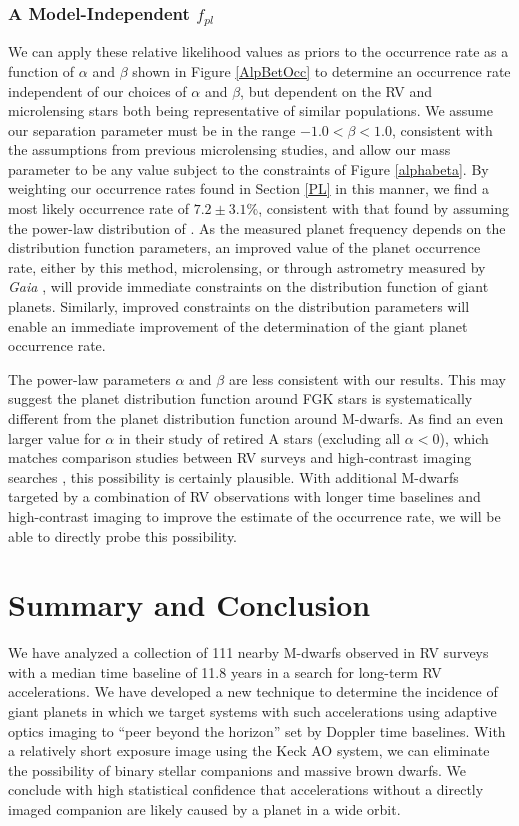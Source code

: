 \subsubsection{A Model-Independent $f_{pl}$}
We can apply these relative likelihood values as priors to the occurrence rate as a function of $\alpha$ and $\beta$ shown in Figure \ref{AlpBetOcc} to determine an occurrence rate independent of our choices of $\alpha$ and $\beta$, but dependent on the RV and microlensing stars both being representative of similar populations. We assume our separation parameter must be in the range $-1.0 < \beta < 1.0$, consistent with the assumptions from previous microlensing studies, and allow our mass parameter to be any value subject to the constraints of Figure \ref{alphabeta}. By weighting our occurrence rates found in Section \ref{PL} in this manner, we find a most likely occurrence rate of $7.2 \pm 3.1\%$, consistent with that found by assuming the power-law distribution of \citet{Cumming08}. As the measured planet frequency depends on the distribution function parameters, an improved value of the planet occurrence rate, either by this method, microlensing, or through astrometry measured by \textit{Gaia} \citep{Casertano08}, will provide immediate constraints on the distribution function of giant planets. Similarly, improved constraints on the distribution parameters will enable an immediate improvement of the determination of the giant planet occurrence rate.

The \citet{Cumming08} power-law parameters $\alpha$ and $\beta$ are less consistent with our results. This may suggest the planet distribution function around FGK stars is systematically different from the planet distribution function around M-dwarfs. As \citet{Bowler10} find an even larger value for $\alpha$ in their study of retired A stars (excluding all $\alpha < 0$), which matches comparison studies between RV surveys and high-contrast imaging searches \citep{Crepp11}, this possibility is certainly plausible. With additional M-dwarfs targeted by a combination of RV observations with longer time baselines and high-contrast imaging to improve the estimate of the occurrence rate, we will be able to directly probe this possibility.




\section{Summary and Conclusion}
\label{SC}
We have analyzed a collection of 111 nearby M-dwarfs observed in RV surveys with a median time baseline of 11.8 years in a search for long-term RV accelerations. We have developed a new technique to determine the incidence of giant planets in which we target systems with such accelerations using adaptive optics imaging to ``peer beyond the horizon'' set by Doppler time baselines. With a relatively short exposure image using the Keck AO system, we can eliminate the possibility of binary stellar companions and massive brown dwarfs. We conclude with high statistical confidence that accelerations without a directly imaged companion are likely caused by a planet in a wide orbit. 

